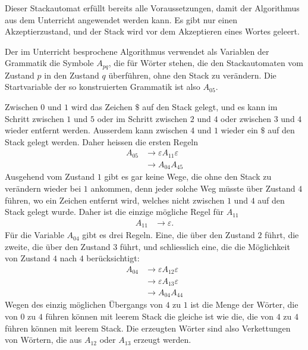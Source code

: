 \begin{loesung}
Dieser Stackautomat erfüllt bereits alle Voraussetzungen, damit
der Algorithmus aus dem Unterricht angewendet werden kann. Es gibt nur
einen Akzeptierzustand, und der Stack wird vor dem Akzeptieren
eines Wortes geleert.

Der im Unterricht besprochene Algorithmus verwendet als Variablen der
Grammatik die Symbole $A_{pq}$, die für Wörter stehen, die den
Stackautomaten vom Zustand $p$ in den Zustand $q$ überführen, ohne
den Stack zu verändern. Die Startvariable der so konstruierten Grammatik
ist also $A_{05}$.

Zwischen $0$ und $1$ wird das Zeichen $\texttt{\$}$ auf den Stack gelegt,
und es kann im Schritt zwischen $1$ und $5$ oder im Schritt zwischen $2$
und $4$ oder zwischen $3$ und $4$ wieder entfernt werden. Ausserdem
kann zwischen $4$ und $1$ wieder ein $\texttt{\$}$ auf den Stack gelegt
werden. Daher heissen die ersten Regeln
\begin{align*}
A_{05}&\to \varepsilon A_{11}\varepsilon \\
      &\to A_{04}A_{45}
\end{align*}
Ausgehend vom Zustand $1$ gibt es gar keine Wege, die ohne den Stack zu
verändern wieder bei $1$ ankommen, denn jeder solche Weg müsste über
Zustand $4$ führen, wo ein Zeichen entfernt wird, welches nicht zwischen
$1$ und $4$ auf den Stack gelegt wurde. Daher ist die einzige mögliche
Regel für $A_{11}$
\begin{align*}
A_{11}&\to\varepsilon.
\end{align*}
Für die Variable $A_{04}$ gibt es drei Regeln. Eine, die über den
Zustand $2$ führt, die zweite, die über den Zustand $3$ führt, und
schliesslich eine, die die Möglichkeit von Zustand $4$ nach $4$ 
berücksichtigt:
\begin{equation}
\begin{aligned}
A_{04}&\to \varepsilon A_{12}\varepsilon\\
      &\to \varepsilon A_{13}\varepsilon\\
      &\to A_{04}A_{44}
\end{aligned}
\label{40000041:a04}
\end{equation}
Wegen des einzig möglichen Übergangs von $4$ zu $1$ ist die Menge der
Wörter, die von $0$ zu $4$ führen können mit leerem Stack die gleiche
ist wie die, die von $4$ zu $4$ führen können mit leerem Stack.
Die erzeugten Wörter sind also Verkettungen von Wörtern, die
aus $A_{12}$ oder $A_{13}$ erzeugt werden.


\end{loesung}
